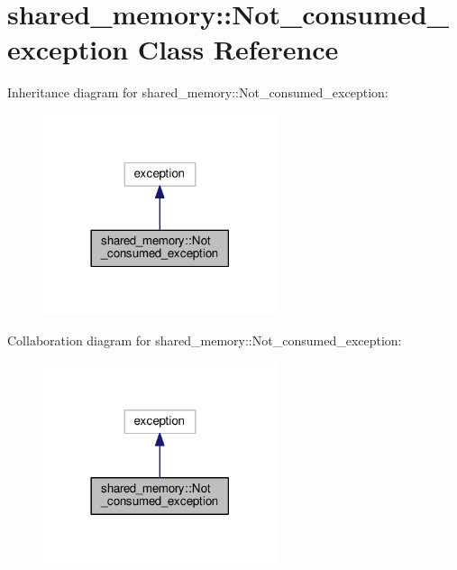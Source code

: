 \hypertarget{classshared__memory_1_1Not__consumed__exception}{}\section{shared\+\_\+memory\+:\+:Not\+\_\+consumed\+\_\+exception Class Reference}
\label{classshared__memory_1_1Not__consumed__exception}


Inheritance diagram for shared\+\_\+memory\+:\+:Not\+\_\+consumed\+\_\+exception\+:
\nopagebreak
\begin{figure}[H]
\begin{center}
\leavevmode
\includegraphics[width=194pt]{classshared__memory_1_1Not__consumed__exception__inherit__graph}
\end{center}
\end{figure}


Collaboration diagram for shared\+\_\+memory\+:\+:Not\+\_\+consumed\+\_\+exception\+:
\nopagebreak
\begin{figure}[H]
\begin{center}
\leavevmode
\includegraphics[width=194pt]{classshared__memory_1_1Not__consumed__exception__coll__graph}
\end{center}
\end{figure}
